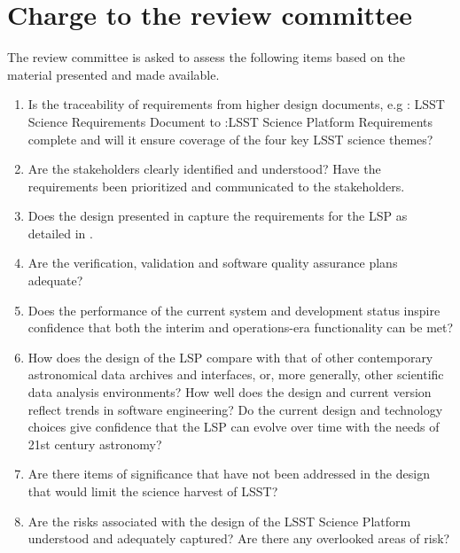 \documentclass[DM,lsstdraft,STS,toc]{lsstdoc}
\begin{document}
\newpage
\section{Charge to the review committee} 
\label{sec:charge}
The review committee is asked to assess the following items based on the material presented and made available. 
%
\begin{enumerate}
\item Is the traceability of requirements from higher design documents, e.g : LSST Science Requirements Document  
to :LSST Science Platform Requirements complete and will it ensure coverage of the four key LSST science themes?
%
\item Are the stakeholders clearly identified and understood? Have the requirements been prioritized and communicated to the stakeholders.
%
\item Does the design presented in  capture the requirements for the LSP as detailed in .
%
\item  Are the verification, validation and software quality assurance plans adequate? 
%
\item Does the performance of the current system and development status inspire confidence that both the interim and operations-era functionality can be met?  
%
\item How does the design of the LSP compare with that of other contemporary astronomical data archives and interfaces, or, more generally, other scientific data analysis environments? 
How well does the design and current version reflect trends in software engineering? Do the current design and technology choices give confidence that the LSP can 
evolve over time with the needs of 21st century astronomy?
%
\item Are there items of significance that have not been addressed in the design that would limit the science harvest of LSST?
%
\item Are the risks associated with the design of the LSST Science Platform understood and adequately captured? Are there any overlooked areas of risk? 

\end{enumerate}
\end{document}

